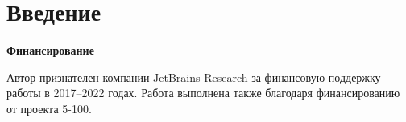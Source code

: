 
\chapter*{Введение}                         %



\textbf{Финансирование}

Автор признателен компании JetBrains Research за финансовую поддержку работы в 2017--2022 годах.
Работа выполнена также благодаря финансированию от проекта 5-100.